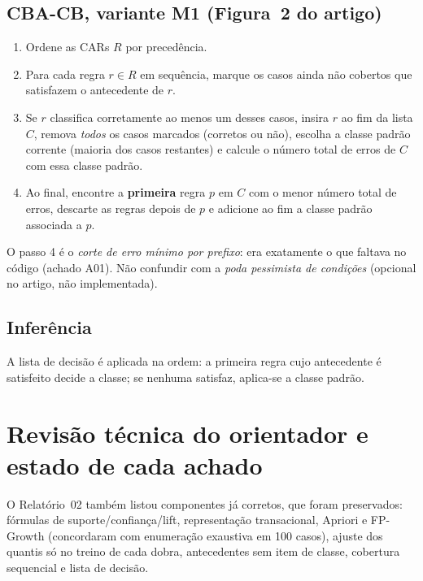 \documentclass[a4paper,11pt]{article}
\begin{document}
\subsection{CBA-CB, variante M1 (Figura~2 do artigo)}
\begin{enumerate}[label=\arabic*.]
  \item Ordene as CARs $R$ por preced\^encia.
  \item Para cada regra $r\in R$ em sequ\^encia, marque os casos ainda n\~ao cobertos que satisfazem o antecedente de $r$.
  \item Se $r$ classifica corretamente ao menos um desses casos, insira $r$ ao fim da lista $C$, remova \emph{todos} os casos marcados (corretos ou n\~ao), escolha a classe padr\~ao corrente (maioria dos casos restantes) e calcule o n\'umero total de erros de $C$ com essa classe padr\~ao.
  \item Ao final, encontre a \textbf{primeira} regra $p$ em $C$ com o menor n\'umero total de erros, descarte as regras depois de $p$ e adicione ao fim a classe padr\~ao associada a $p$.
\end{enumerate}
O passo 4 \'e o \emph{corte de erro m\'inimo por prefixo}: era exatamente o que faltava no c\'odigo (achado A01). N\~ao confundir com a \emph{poda pessimista de condi\c{c}\~oes} (opcional no artigo, n\~ao implementada).

\subsection{Infer\^encia}
A lista de decis\~ao \'e aplicada na ordem: a primeira regra cujo antecedente \'e satisfeito decide a classe; se nenhuma satisfaz, aplica-se a classe padr\~ao.

\section{Revis\~ao t\'ecnica do orientador e estado de cada achado}

O Relat\'orio~02 tamb\'em listou componentes j\'a corretos, que foram preservados: f\'ormulas de suporte/confian\c{c}a/lift, representa\c{c}\~ao transacional, Apriori e FP-Growth (concordaram com enumera\c{c}\~ao exaustiva em 100 casos), ajuste dos quantis s\'o no treino de cada dobra, antecedentes sem item de classe, cobertura sequencial e lista de decis\~ao.
\end{document}

